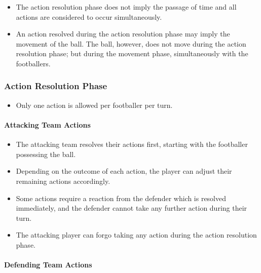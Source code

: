 \documentclass[12pt]{article}
\begin{document}
\begin{note}
\begin{itemize}
\item The action resolution phase does not imply the passage of time and all actions are considered to occur simultaneously.
\item An action resolved during the action resolution phase may imply the movement of the ball. The ball, however, does not move during the action resolution phase; but during the movement phase, simultaneously with the footballers.
\end{itemize}
\end{note}

\subsubsection{Action Resolution Phase}

\begin{rulebox}
\begin{itemize}
\item Only one action is allowed per footballer per turn.
\end{itemize}
\end{rulebox}

\paragraph{Attacking Team Actions}

\begin{rulebox}
\begin{itemize}
\item The attacking team resolves their actions first, starting with the footballer possessing the ball.
\item Depending on the outcome of each action, the player can adjust their remaining actions accordingly.
\item Some actions require a reaction from the defender which is resolved immediately, and the defender cannot take any further action during their turn.
\item The attacking player can forgo taking any action during the action resolution phase.
\end{itemize}
\end{rulebox}

\paragraph{Defending Team Actions}
\end{document}
